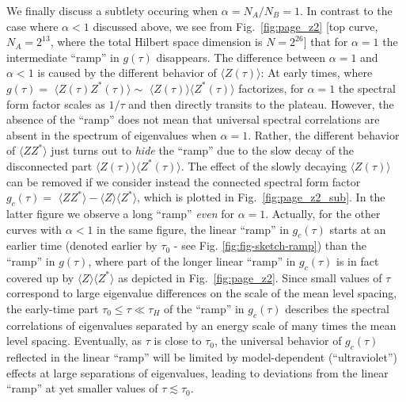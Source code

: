\documentclass[aps,prb,preprint,onecolumn,amsmath,amssymb,superscriptaddress,eqsecnum,floatfix,scrartcl]{revtex4-1}
\begin{document}
We finally discuss a subtlety occuring
when $\alpha= N_A/N_B =1$.
In contrast to the case where $\alpha <1$ discussed above, we see from
Fig.~\ref{fig:page_z2} [top curve, $N_A=2^{13}$, where the total Hilbert space dimension is $N=2^{26}$]
 that for $\alpha=1$  the intermediate ``ramp''  in $g(\tau)$ disappears. 
 The difference between $\alpha=1$ and $\alpha<1$ is caused by
the different behavior of
$\langle Z(\tau)\rangle$:
At early times, where  $g(\tau)=$ $\langle Z(\tau)Z^*(\tau)\rangle \sim$ $ \langle Z(\tau)\rangle\langle Z^*(\tau)\rangle$
factorizes, for $\alpha=1$ 
the spectral form factor
scales as $1/\tau$ and then directly transits to the  plateau. 
However, the
absence of the ``ramp'' does not mean that
universal spectral correlations are 
absent
 in the spectrum  of
eigenvalues when $\alpha=1$. Rather, the different
behavior of
$\langle ZZ^*\rangle$
just  turns out to  {\it hide} the ``ramp'' due to the slow decay of 
the disconnected part $\langle Z(\tau)\rangle\langle Z^*(\tau)\rangle$.
The effect of the slowly decaying $\langle Z(\tau)\rangle$ can be removed if we 
consider instead the connected  spectral form factor
$g_c(\tau)=$
$\langle ZZ^*\rangle-\langle Z\rangle\langle Z^*\rangle$,
which is plotted in
Fig.~\ref{fig:page_z2_sub}. In the latter figure  we observe a long ``ramp'' {\it even}  for $\alpha=1$.
Actually, for the
other
curves with $\alpha<1$ in the same figure, the linear ``ramp''
in $g_c(\tau)$ starts at an earlier time (denoted earlier by $\tau_0$ - see Fig. \ref{fig:fig-sketch-ramp})
than the ``ramp'' in $g(\tau)$,
where part of the longer linear ``ramp'' in $g_c(\tau)$
is
in fact covered up by $\langle Z\rangle\langle Z^*\rangle$ as  depicted in Fig.~\ref{fig:page_z2}. 
Since small values of $\tau$ correspond to large eigenvalue differences
on the scale of the mean level spacing,
the early-time part $\tau_0 \leq \tau \ll \tau_H$
of  the ``ramp'' in $g_c(\tau)$  describes
the
spectral correlations
of eigenvalues  separated by an energy scale of many times the mean level spacing.
Eventually, as $\tau$ is close to $\tau_0$,  the universal behavior of $g_c(\tau)$ reflected in the linear ``ramp''  will be limited
 by model-dependent (``ultraviolet'') effects at large separations of eigenvalues, leading to deviations from the linear ``ramp'' at 
yet smaller 
values of $\tau \lesssim \tau_0$.
\end{document}
